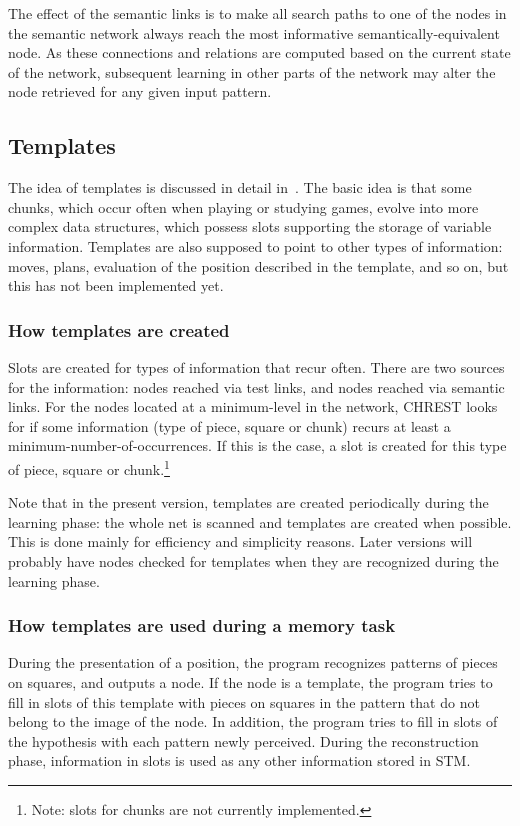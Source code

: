 \documentclass{article}
\begin{document}
The effect of the semantic links is to make all search paths to one of the
nodes in the semantic network always reach the most informative
semantically-equivalent node.  As these connections and relations are computed
based on the current state of the network, subsequent learning in other parts 
of the network may alter the node retrieved for any given input pattern.

\subsection{Templates}

The idea of templates is discussed in detail in~\cite{Gobet96b}.  The basic
idea is that some chunks, which occur often when playing or studying games,
evolve into more complex data structures, which possess slots supporting the
storage of variable information.  Templates are also supposed to point to other
types of information: moves, plans, evaluation of the position described in the
template, and so on, but this has not been implemented yet.

\subsubsection{How templates are created}

Slots are created for types of information that recur often. There are two
sources for the information: nodes reached via test links, and nodes reached
via semantic links.  For the nodes located at a minimum-level in the network,
CHREST looks for if some information (type of piece, square or chunk) recurs at
least a minimum-number-of-occurrences. If this is the case, a slot is created
for this type of piece, square or chunk.\footnote{Note: slots for chunks are
not currently implemented.}

Note that in the present version, templates are created periodically during 
the learning phase: the whole net is scanned and templates are created when 
possible. This is done mainly for efficiency and simplicity reasons. 
Later versions will probably have nodes checked for templates when they are 
recognized during the learning phase.

\subsubsection{How templates are used during a memory task}

During the presentation of a position, the program recognizes patterns of
pieces on squares, and outputs a node. If the node is a template, the program
tries to fill in slots of this template with pieces on squares in the pattern
that do not belong to the image of the node. In addition, the program tries to
fill in slots of the hypothesis with each pattern newly perceived. During the
reconstruction phase, information in slots is used as any other information
stored in STM.
\end{document}

